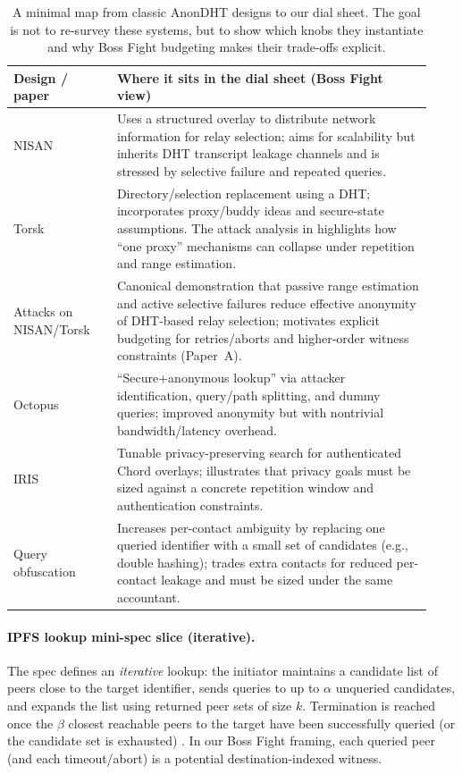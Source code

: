 \documentclass[11pt]{article}
\begin{document}
\begin{table}[t]
\centering
\begin{tabular}{@{}p{0.23\linewidth}p{0.70\linewidth}@{}}
\toprule
Design / paper & Where it sits in the dial sheet (Boss Fight view) \\
\midrule
NISAN \cite{panchenko2009nisan} & Uses a structured overlay to distribute network information for relay selection; aims for scalability but inherits DHT transcript leakage channels and is stressed by selective failure and repeated queries. \\
Torsk \cite{mclachlan2009torsk} & Directory/selection replacement using a DHT; incorporates proxy/buddy ideas and secure-state assumptions. The attack analysis in \cite{wang2010lookup} highlights how ``one proxy'' mechanisms can collapse under repetition and range estimation. \\
Attacks on NISAN/Torsk \cite{wang2010lookup} & Canonical demonstration that passive range estimation and active selective failures reduce effective anonymity of DHT-based relay selection; motivates explicit budgeting for retries/aborts and higher-order witness constraints (Paper~A). \\
Octopus \cite{wang2012octopus} & ``Secure+anonymous lookup'' via attacker identification, query/path splitting, and dummy queries; improved anonymity but with nontrivial bandwidth/latency overhead. \\
IRIS \cite{aktypi2025iris} & Tunable privacy-preserving search for authenticated Chord overlays; illustrates that privacy goals must be sized against a concrete repetition window and authentication constraints. \\
Query obfuscation \cite{daniel2025queryobfuscation} & Increases per-contact ambiguity by replacing one queried identifier with a small set of candidates (e.g., double hashing); trades extra contacts for reduced per-contact leakage and must be sized under the same accountant. \\
\bottomrule
\end{tabular}
\caption{A minimal map from classic AnonDHT designs to our dial sheet. The goal is not to re-survey these systems, but to show which knobs they instantiate and why Boss Fight budgeting makes their trade-offs explicit.}
\label{tab:pattern-map}
\end{table}


\paragraph{IPFS lookup mini-spec slice (iterative).}
The spec defines an \emph{iterative} lookup: the initiator maintains a candidate list of peers close to the target identifier, sends queries to up to $\alpha$ unqueried candidates, and expands the list using returned peer sets of size $k$.
Termination is reached once the $\beta$ closest reachable peers to the target have been successfully queried (or the candidate set is exhausted) \cite{ipfs_kad_spec}.
In our Boss Fight framing, each queried peer (and each timeout/abort) is a potential destination-indexed witness.
\end{document}
